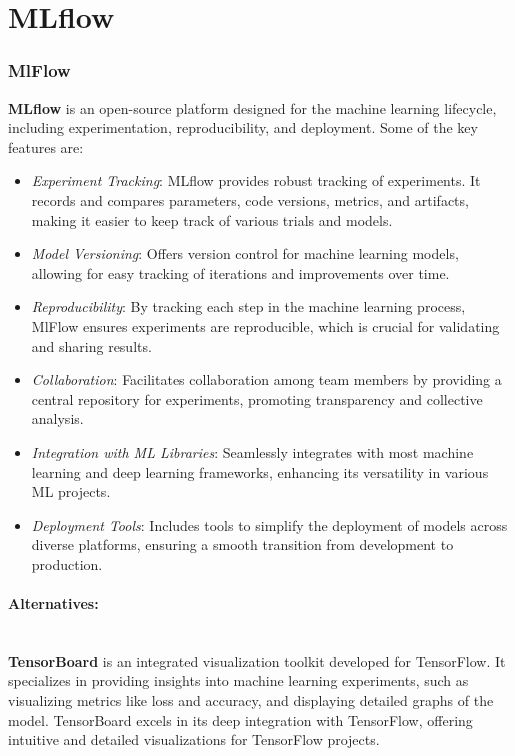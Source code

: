\section{MLflow}
\label{section:mlflow_docker}



\subsubsection{MlFlow}

\textbf{MLflow} \cite{MLflowWeb} is an open-source platform designed for the machine learning lifecycle, including experimentation, reproducibility, and deployment. Some of the key features are: 

\begin{itemize}
    \item \textit{Experiment Tracking}: MLflow provides robust tracking of experiments. It records and compares parameters, code versions, metrics, and artifacts, making it easier to keep track of various trials and models.
    \item \textit{Model Versioning}: Offers version control for machine learning models, allowing for easy tracking of iterations and improvements over time.
    \item \textit{Reproducibility}: By tracking each step in the machine learning process, MlFlow ensures experiments are reproducible, which is crucial for validating and sharing results.
    \item \textit{Collaboration}: Facilitates collaboration among team members by providing a central repository for experiments, promoting transparency and collective analysis.
    \item \textit{Integration with ML Libraries}: Seamlessly integrates with most machine learning and deep learning frameworks, enhancing its versatility in various ML projects.
    \item \textit{Deployment Tools}: Includes tools to simplify the deployment of models across diverse platforms, ensuring a smooth transition from development to production.
\end{itemize}


\paragraph{Alternatives:} \mbox{}\\
\textbf{TensorBoard} \cite{TensorBoardWeb} is an integrated visualization toolkit developed for TensorFlow. It specializes in providing insights into machine learning experiments, such as visualizing metrics like loss and accuracy, and displaying detailed graphs of the model. TensorBoard excels in its deep integration with TensorFlow, offering intuitive and detailed visualizations for TensorFlow projects. \\

